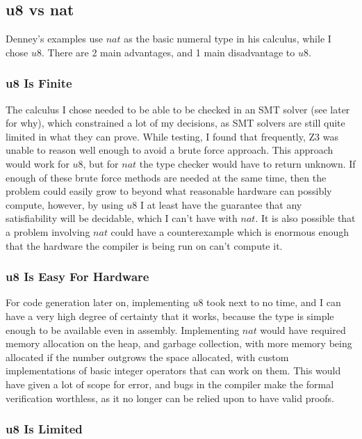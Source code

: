 \subsection{u8 vs nat}

Denney's examples use $nat$ as the basic numeral type in his calculus, while I chose $u8$.
There are 2 main advantages, and 1 main disadvantage to $u8$.

\subsubsection{u8 Is Finite}

The calculus I chose needed to be able to be checked in an SMT solver (see later for why), which
constrained a lot of my decisions, as SMT solvers are still quite limited in what they can prove.
While testing, I found that frequently, Z3 was unable to reason well enough to avoid a brute force
approach.
This approach would work for $u8$, but for $nat$ the type checker would have to return unknown.
If enough of these brute force methods are needed at the same time, then the problem could easily
grow to beyond what reasonable hardware can possibly compute, however, by using $u8$ I at least
have the guarantee that any satisfiability will be decidable, which I can't have with $nat$.
It is also possible that a problem involving $nat$ could have a counterexample which is enormous
enough that the hardware the compiler is being run on can't compute it.

\subsubsection{u8 Is Easy For Hardware}

For code generation later on, implementing $u8$ took next to no time, and I can have a very high
degree of certainty that it works, because the type is simple enough to be available even in
assembly.
Implementing $nat$ would have required memory allocation on the heap, and garbage collection,
with more memory being allocated if the number outgrows the space allocated, with custom
implementations of basic integer operators that can work on them.
This would have given a lot of scope for error, and bugs in the compiler make the formal verification
worthless, as it no longer can be relied upon to have valid proofs.

\subsubsection{u8 Is Limited}

